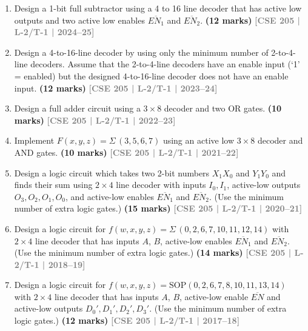 \documentclass[12pt]{article}
\newcommand{\yr}[1]{\hfill\textcolor{gray}{\small\textbf{[#1]}}}
\newcommand{\mk}[1]{\textcolor{orange!70!black}{\small\textbf{(#1 marks)}}}
\begin{document}
\begin{enumerate}

\item Design a 1-bit full subtractor using a 4 to 16 line decoder that has active low outputs and two active low enables $\overline{EN_1}$ and $\overline{EN_2}$.
\mk{12} \yr{CSE 205 | L-2/T-1 | 2024--25}



\item Design a 4-to-16-line decoder by using only the minimum number of 2-to-4-line decoders. Assume that the 2-to-4-line decoders have an enable input (`1' = enabled) but the designed 4-to-16-line decoder does not have an enable input.
\mk{12} \yr{CSE 205 | L-2/T-1 | 2023--24}



\item Design a full adder circuit using a $3 \times 8$ decoder and two OR gates.
\mk{10} \yr{CSE 205 | L-2/T-1 | 2022--23}



\item Implement $F(x, y, z) = \Sigma\,(3, 5, 6, 7)$ using an active low $3 \times 8$ decoder and AND gates.
\mk{10} \yr{CSE 205 | L-2/T-1 | 2021--22}



    \item Design a logic circuit which takes two 2-bit numbers $X_1X_0$ and $Y_1Y_0$ and finds their sum using $2\times4$ line decoder with inputs $I_0, I_1$, active-low outputs $O_3, O_2, O_1, O_0$, and active-low enables $\overline{EN_1}$ and $\overline{EN_2}$. (Use the minimum number of extra logic gates.)
    \mk{15} \yr{CSE 205 | L-2/T-1 | 2020--21}
    
    

\item Design a logic circuit for $f(w, x, y, z) = \Sigma\,(0, 2, 6, 7, 10, 11, 12, 14)$ with $2\times4$ line decoder that has inputs $A$, $B$, active-low enables $\overline{EN_1}$ and $\overline{EN_2}$. (Use the minimum number of extra logic gates.)
\mk{14} \yr{CSE 205 | L-2/T-1 | 2018--19}



\item Design a logic circuit for $f(w, x, y, z) = \mathrm{SOP}(0, 2, 6, 7, 8, 10, 11, 13, 14)$ with $2\times4$ line decoder that has inputs $A$, $B$, active-low enable $\overline{EN}$ and active-low outputs $D_0', D_1', D_2', D_3'$. (Use the minimum number of extra logic gates.)
\mk{12} \yr{CSE 205 | L-2/T-1 | 2017--18}





\end{enumerate}
\end{document}
